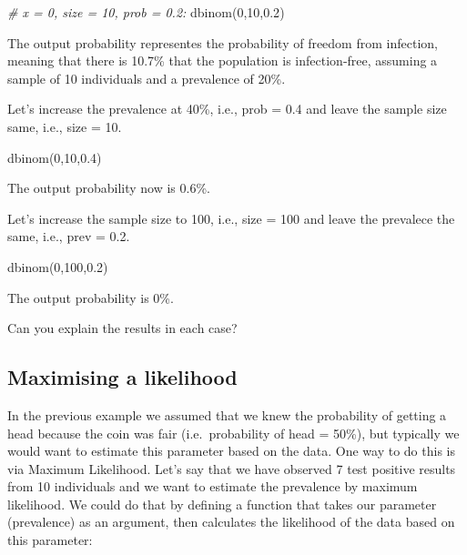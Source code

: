 \documentclass[
  12pt,
]{article}
\newenvironment{Shaded}{\begin{snugshade}}{\end{snugshade}}
\newcommand{\CommentTok}[1]{\textcolor[rgb]{0.56,0.35,0.01}{\textit{#1}}}
\newcommand{\DecValTok}[1]{\textcolor[rgb]{0.00,0.00,0.81}{#1}}
\newcommand{\FloatTok}[1]{\textcolor[rgb]{0.00,0.00,0.81}{#1}}
\newcommand{\FunctionTok}[1]{\textcolor[rgb]{0.00,0.00,0.00}{#1}}
\newcommand{\NormalTok}[1]{#1}
\begin{document}
\begin{Shaded}
\begin{Highlighting}[]
\CommentTok{\# x = 0, size = 10, prob = 0.2:}
\FunctionTok{dbinom}\NormalTok{(}\DecValTok{0}\NormalTok{,}\DecValTok{10}\NormalTok{,}\FloatTok{0.2}\NormalTok{)}
\end{Highlighting}
\end{Shaded}

The output probability representes the probability of freedom from
infection, meaning that there is 10.7\% that the population is
infection-free, assuming a sample of 10 individuals and a prevalence of
20\%.

Let's increase the prevalence at 40\%, i.e., prob = 0.4 and leave the
sample size same, i.e., size = 10.

\begin{Shaded}
\begin{Highlighting}[]
\FunctionTok{dbinom}\NormalTok{(}\DecValTok{0}\NormalTok{,}\DecValTok{10}\NormalTok{,}\FloatTok{0.4}\NormalTok{)}
\end{Highlighting}
\end{Shaded}

The output probability now is 0.6\%.

Let's increase the sample size to 100, i.e., size = 100 and leave the
prevalece the same, i.e., prev = 0.2.

\begin{Shaded}
\begin{Highlighting}[]
\FunctionTok{dbinom}\NormalTok{(}\DecValTok{0}\NormalTok{,}\DecValTok{100}\NormalTok{,}\FloatTok{0.2}\NormalTok{)}
\end{Highlighting}
\end{Shaded}

The output probability is 0\%.

Can you explain the results in each case?

\hypertarget{maximising-a-likelihood}{%
\subsection{Maximising a likelihood}\label{maximising-a-likelihood}}

In the previous example we assumed that we knew the probability of
getting a head because the coin was fair (i.e.~probability of head =
50\%), but typically we would want to estimate this parameter based on
the data. One way to do this is via Maximum Likelihood. Let's say that
we have observed 7 test positive results from 10 individuals and we want
to estimate the prevalence by maximum likelihood. We could do that by
defining a function that takes our parameter (prevalence) as an
argument, then calculates the likelihood of the data based on this
parameter:
\end{document}
